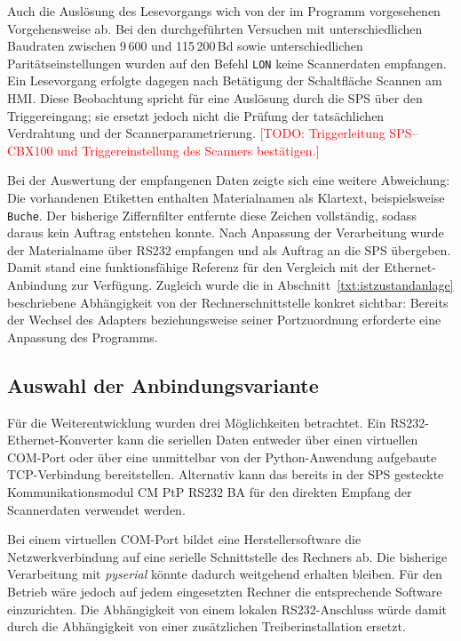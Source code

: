 Auch die Auslösung des Lesevorgangs wich von der im Programm vorgesehenen Vorgehensweise ab. Bei den durchgeführten Versuchen mit unterschiedlichen Baudraten zwischen 9\,600 und 115\,200\,Bd sowie unterschiedlichen Paritätseinstellungen wurden auf den Befehl \texttt{LON} keine Scannerdaten empfangen. Ein Lesevorgang erfolgte dagegen nach Betätigung der Schaltfläche \glqq Scannen\grqq{} am HMI. Diese Beobachtung spricht für eine Auslösung durch die SPS über den Triggereingang; sie ersetzt jedoch nicht die Prüfung der tatsächlichen Verdrahtung und der Scannerparametrierung. \textcolor{red}{[TODO: Triggerleitung SPS--CBX100 und Triggereinstellung des Scanners bestätigen.]}

Bei der Auswertung der empfangenen Daten zeigte sich eine weitere Abweichung: Die vorhandenen Etiketten enthalten Materialnamen als Klartext, beispielsweise \texttt{Buche}. Der bisherige Ziffernfilter entfernte diese Zeichen vollständig, sodass daraus kein Auftrag entstehen konnte. Nach Anpassung der Verarbeitung wurde der Materialname über RS232 empfangen und als Auftrag an die SPS übergeben. Damit stand eine funktionsfähige Referenz für den Vergleich mit der Ethernet-Anbindung zur Verfügung. Zugleich wurde die in Abschnitt~\ref{txt:istzustandanlage} beschriebene Abhängigkeit von der Rechnerschnittstelle konkret sichtbar: Bereits der Wechsel des Adapters beziehungsweise seiner Portzuordnung erforderte eine Anpassung des Programms.

\subsection{Auswahl der Anbindungsvariante}
\label{sec:qr_varianten}

Für die Weiterentwicklung wurden drei Möglichkeiten betrachtet. Ein RS232-Ethernet-Konverter kann die seriellen Daten entweder über einen virtuellen COM-Port oder über eine unmittelbar von der Python-Anwendung aufgebaute TCP-Verbindung bereitstellen. Alternativ kann das bereits in der SPS gesteckte Kommunikationsmodul CM PtP RS232 BA für den direkten Empfang der Scannerdaten verwendet werden.

Bei einem virtuellen COM-Port bildet eine Herstellersoftware die Netzwerkverbindung auf eine serielle Schnittstelle des Rechners ab. Die bisherige Verarbeitung mit \emph{pyserial} könnte dadurch weitgehend erhalten bleiben. Für den Betrieb wäre jedoch auf jedem eingesetzten Rechner die entsprechende Software einzurichten. Die Abhängigkeit von einem lokalen RS232-Anschluss würde damit durch die Abhängigkeit von einer zusätzlichen Treiberinstallation ersetzt. \cite[Abschn.~2.3.2]{usr410s_grundlagen}

